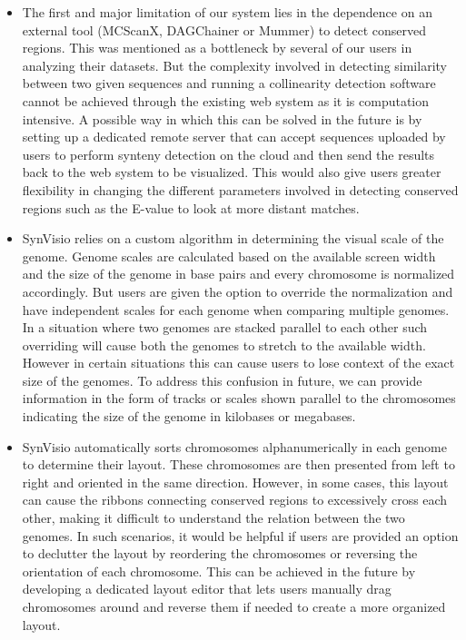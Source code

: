  \begin{itemize}
    \item The first and major limitation of our system lies in the dependence on an external tool (MCScanX, DAGChainer or Mummer) to detect conserved regions. This was mentioned as a bottleneck by several of our users in analyzing their datasets. But the complexity involved in detecting similarity between two given sequences and running a collinearity detection software cannot be achieved through the existing web system as it is computation intensive. A possible way in which this can be solved in the future is by setting up a dedicated remote server that can accept sequences uploaded by users to perform synteny detection on the cloud and then send the results back to the web system to be visualized. This would also give users greater flexibility in changing the different parameters involved in detecting conserved regions such as the E-value  to look at more distant matches.    
    
    \item SynVisio relies on a custom algorithm in determining the visual scale of the genome. Genome scales are calculated based on the available screen width and the size of the genome in base pairs and every chromosome is normalized accordingly. But users are given the option to override the normalization and have independent scales for each genome when comparing multiple genomes. In a situation where two genomes are stacked parallel to each other such overriding will cause both the genomes to stretch to the available width. However in certain situations this can cause users to lose context of the exact size of the genomes. To address this confusion in future, we can provide information in the form of tracks or scales shown parallel to the chromosomes indicating the size of the genome in kilobases or megabases.
    
    \item SynVisio automatically sorts chromosomes alphanumerically in each genome to determine their layout. These chromosomes are then presented from left to right and oriented in the same direction. However, in some cases, this layout can cause the ribbons connecting conserved regions to excessively cross each other, making it difficult to understand the relation between the two genomes. In such scenarios, it would be helpful if users are provided an option to declutter the layout by reordering the chromosomes or reversing the orientation of each chromosome. This can be achieved in the future by developing a dedicated layout editor that lets users manually drag chromosomes around and reverse them if needed to create a more organized layout.
    

\end{itemize}
